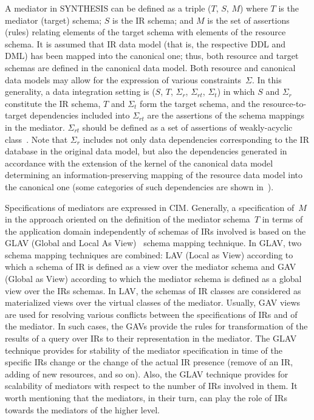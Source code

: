 \begin{multicols}{2}
  A mediator in SYNTHESIS can be defined as a triple ($T$, $S$, $M$) where $T$
is the mediator (target) schema; $S$ is the IR schema; and $M$ is the set of assertions
(rules) relating elements of the target schema with elements of the resource schema. It
is assumed that IR data model (that is, the respective DDL and DML) has been
mapped into the canonical one; thus, both resource and target schemas are defined in
the canonical data model. Both resource and canonical data models may allow for the
expression of various constraints~$\Sigma$. In this generality, a data integration
setting is ($S$, $T$, $\Sigma_{r}$, $\Sigma_{{rt}}$, $\Sigma_{t}$) in which $S$ and
$\Sigma_r$ constitute the IR schema, $T$ and $\Sigma_t$ form the target schema, and
the resource-to-target dependencies included into $\Sigma_{{rt}}$ are the assertions of
the schema mappings in the mediator. $\Sigma_{{rt}}$ should be defined as a set of
assertions of weakly-acyclic class~\cite{7-kal, 17-kal}. Note that $\Sigma_r$ includes
not only data dependencies corresponding to the IR database in the original data
model, but also the dependencies generated in accordance with the extension of the
kernel of the canonical data model determining an information-preserving mapping of
the resource data model into the canonical one (some categories of such dependencies
are shown in~\cite{6-kal, 7-kal}).

  Specifications of mediators are expressed in CIM. Generally, a specification
of~$M$ in the approach oriented on the definition of the mediator schema~$T$ in
terms of the application domain independently of schemas of IRs involved is based on
the GLAV (Global and Local As View)~\cite{18-kal, 34-kal} schema mapping technique. In GLAV, two schema
mapping techniques are combined: LAV (Local as View) according to which a
schema of IR is defined as a view over the mediator schema and GAV (Global as
View) according to which the mediator schema is defined  as a global view over the
IRs schemas. In LAV, the schemas of IR classes are considered as materialized views
over the virtual classes of the mediator. Usually, GAV views are used for resolving
various conflicts between the specifications of IRs and of the mediator. In such cases,
the GAVs provide the rules for transformation of the results of a query over IRs
to their representation in the mediator. The GLAV technique provides for stability of the
mediator specification in time of the specific IRs change or the change of the actual
IR presence (remove of an IR, adding of new resources, and so on). Also, the GLAV
technique provides for scalability of mediators with respect to the number of IRs
involved in them. It worth mentioning that the mediators, in their turn, can play the role of
IRs towards the mediators of the higher level.


\end{multicols}

